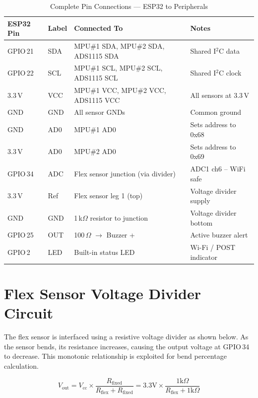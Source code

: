 \documentclass[12pt,a4paper]{report}
\begin{document}
\begin{table}[H]
\centering
\caption{Complete Pin Connections — ESP32 to Peripherals}
\label{tab:pinout}
\begin{tabularx}{\columnwidth}{lllX}
\toprule
\textbf{ESP32 Pin} & \textbf{Label} & \textbf{Connected To} & \textbf{Notes} \\
\midrule
GPIO\,21  & SDA  & MPU\#1 SDA, MPU\#2 SDA, ADS1115 SDA & Shared I$^2$C data \\
GPIO\,22  & SCL  & MPU\#1 SCL, MPU\#2 SCL, ADS1115 SCL & Shared I$^2$C clock \\
3.3\,V    & VCC  & MPU\#1 VCC, MPU\#2 VCC, ADS1115 VCC & All sensors at 3.3\,V \\
GND       & GND  & All sensor GNDs                       & Common ground \\
GND       & AD0  & MPU\#1 AD0                            & Sets address to 0x68 \\
3.3\,V    & AD0  & MPU\#2 AD0                            & Sets address to 0x69 \\
GPIO\,34  & ADC  & Flex sensor junction (via divider)    & ADC1 ch6 -- WiFi safe \\
3.3\,V    & Ref  & Flex sensor leg 1 (top)               & Voltage divider supply \\
GND       & GND  & 1\,k$\Omega$ resistor to junction     & Voltage divider bottom \\
GPIO\,25  & OUT  & 100\,$\Omega$ $\rightarrow$ Buzzer +  & Active buzzer alert \\
GPIO\,2   & LED  & Built-in status LED                   & Wi-Fi / POST indicator \\
\bottomrule
\end{tabularx}
\end{table}

\section{Flex Sensor Voltage Divider Circuit}

The flex sensor is interfaced using a resistive voltage divider as shown below. As the sensor bends, its resistance increases, causing the output voltage at GPIO\,34 to decrease. This monotonic relationship is exploited for bend percentage calculation.

\[
V_{\text{out}} = V_{\text{cc}} \times \frac{R_{\text{fixed}}}{R_{\text{flex}} + R_{\text{fixed}}} = 3.3\text{V} \times \frac{1\text{k}\Omega}{R_{\text{flex}} + 1\text{k}\Omega}
\]
\end{document}
